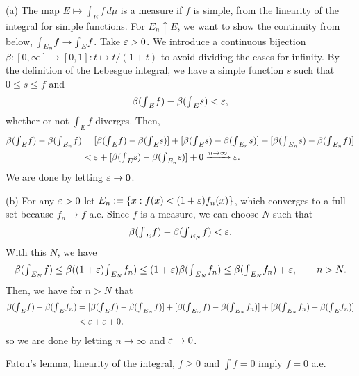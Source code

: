 \documentclass{../../large}
\begin{document}
\begin{pf}
(a)
The map $E\mapsto\int_Ef\,d\mu$ is a measure if $f$ is simple, from the linearity of the integral for simple functions.
For $E_n\uparrow E$, we want to show the continuity from below, ${\textstyle\int}_{E_n}f\to{\textstyle\int}_Ef$.
Take $\varepsilon>0$.
We introduce a continuous bijection $\beta:[0,\infty]\to[0,1]:t\mapsto t/(1+t)$ to avoid dividing the cases for infinity.
By the definition of the Lebesgue integral, we have a simple function $s$ such that $0\le s\le f$ and
\[\beta({\textstyle\int}_Ef)-\beta({\textstyle\int}_Es)<\varepsilon,\]
whether or not $\int_Ef$ diverges.
Then,
\begin{align*}
\beta({\textstyle\int}_Ef)-\beta({\textstyle\int}_{E_n}f)
&=[\beta({\textstyle\int}_Ef)-\beta({\textstyle\int}_Es)]
+[\beta({\textstyle\int}_Es)-\beta({\textstyle\int}_{E_n}s)]
+[\beta({\textstyle\int}_{E_n}s)-\beta({\textstyle\int}_{E_n}f)]\\
&<\varepsilon+[\beta({\textstyle\int}_Es)-\beta({\textstyle\int}_{E_n}s)]+0
\xrightarrow{n\to\infty}\varepsilon.
\end{align*}
We are done by letting $\varepsilon\to0$.

(b)
For any $\varepsilon>0$ let $E_n:=\{x:f(x)<(1+\varepsilon)f_n(x)\}$, which converges to a full set because $f_n\to f$ a.e.
Since $f$ is a measure, we can choose $N$ such that
\[\beta({\textstyle\int}_Ef)-\beta({\textstyle\int}_{E_N}f)<\varepsilon.\]
With this $N$, we have
\[\beta({\textstyle\int}_{E_N}f)
\le\beta((1+\varepsilon){\textstyle\int}_{E_N}f_n)
\le(1+\varepsilon)\beta({\textstyle\int}_{E_N}f_n)
\le\beta({\textstyle\int}_{E_N}f_n)+\varepsilon,\qquad n>N.\]
Then, we have for $n>N$ that
\begin{align*}
\beta({\textstyle\int}_Ef)-\beta({\textstyle\int}_Ef_n)
&=[\beta({\textstyle\int}_Ef)-\beta({\textstyle\int}_{E_N}f)]+[\beta({\textstyle\int}_{E_N}f)-\beta({\textstyle\int}_{E_N}f_n)]+[\beta({\textstyle\int}_{E_N}f_n)-\beta({\textstyle\int}_{E}f_n)]\\
&<\varepsilon+\varepsilon+0,
\end{align*}
so we are done by letting $n\to\infty$ and $\varepsilon\to0$.
\end{pf}

\begin{prb}
Fatou's lemma, linearity of the integral, $f\ge0$ and $\int f=0$ imply $f=0$ a.e.
\end{prb}
\end{document}
